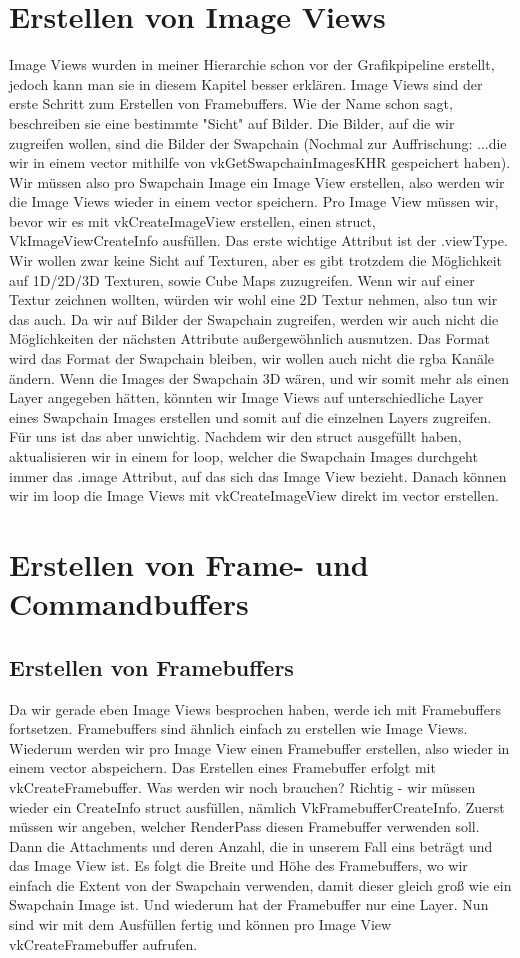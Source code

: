 \documentclass[11pt,a4paper]{report}
\begin{document}
\section{Erstellen von Image Views}
Image Views wurden in meiner Hierarchie schon vor der Grafikpipeline erstellt, jedoch kann man sie in diesem Kapitel besser erklären. Image Views sind der erste Schritt zum Erstellen von Framebuffers. Wie der Name schon sagt, beschreiben sie eine bestimmte "Sicht" auf Bilder. Die Bilder, auf die wir zugreifen wollen, sind die Bilder der Swapchain (Nochmal zur Auffrischung: ...die wir in einem vector mithilfe von vkGetSwapchainImagesKHR gespeichert haben). Wir müssen also pro Swapchain Image ein Image View erstellen, also werden wir die Image Views wieder in einem vector speichern. Pro Image View müssen wir, bevor wir es mit vkCreateImageView erstellen, einen struct, VkImageViewCreateInfo ausfüllen. Das erste wichtige Attribut ist der .viewType. Wir wollen zwar keine Sicht auf Texturen, aber es gibt trotzdem die Möglichkeit auf 1D/2D/3D Texturen, sowie Cube Maps zuzugreifen. Wenn wir auf einer Textur zeichnen wollten, würden wir wohl eine 2D Textur nehmen, also tun wir das auch. Da wir auf Bilder der Swapchain zugreifen, werden wir auch nicht die Möglichkeiten der nächsten Attribute außergewöhnlich ausnutzen. Das Format wird das Format der Swapchain bleiben, wir wollen auch nicht die rgba Kanäle ändern. Wenn die Images der Swapchain 3D wären, und wir somit mehr als einen Layer angegeben hätten, könnten wir Image Views auf unterschiedliche Layer eines Swapchain Images erstellen und somit auf die einzelnen Layers zugreifen. Für uns ist das aber unwichtig. Nachdem wir den struct ausgefüllt haben, aktualisieren wir in einem for loop, welcher die Swapchain Images durchgeht immer das .image Attribut, auf das sich das Image View bezieht. Danach können wir im loop die Image Views mit vkCreateImageView direkt im vector erstellen.

\section{Erstellen von Frame- und Commandbuffers}
\subsection{Erstellen von Framebuffers}
Da wir gerade eben Image Views besprochen haben, werde ich mit Framebuffers fortsetzen. Framebuffers sind ähnlich einfach zu erstellen wie Image Views. Wiederum werden wir pro Image View einen Framebuffer erstellen, also wieder in einem vector abspeichern. Das Erstellen eines Framebuffer erfolgt mit vkCreateFramebuffer. Was werden wir noch brauchen? Richtig - wir müssen wieder ein CreateInfo struct ausfüllen, nämlich VkFramebufferCreateInfo. Zuerst müssen wir angeben, welcher RenderPass diesen Framebuffer verwenden soll. Dann die Attachments und deren Anzahl, die in unserem Fall eins beträgt und das Image View ist. Es folgt die Breite und Höhe des Framebuffers, wo wir einfach die Extent von der Swapchain verwenden, damit dieser gleich groß wie ein Swapchain Image ist. Und wiederum hat der Framebuffer nur eine Layer. Nun sind wir mit dem Ausfüllen fertig und können pro Image View vkCreateFramebuffer aufrufen.
\end{document}
